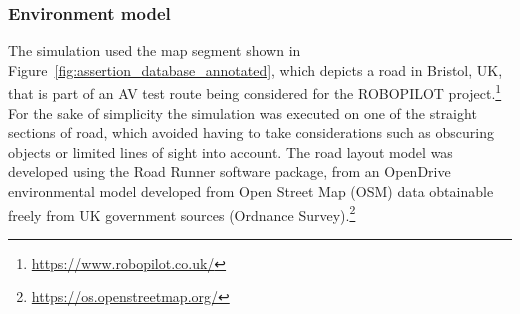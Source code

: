 \subsubsection{Environment model}
The simulation used the map segment shown in Figure~\ref{fig:assertion_database_annotated}, which depicts a road in Bristol, UK, that is part of an AV test route being considered for the ROBOPILOT project.\footnote{\url{https://www.robopilot.co.uk/}} 
%
For the sake of simplicity the simulation was executed on one of the straight sections of road, which avoided having to take considerations such as obscuring objects or limited lines of sight into account. The road layout model was developed using the Road Runner software package, from an OpenDrive environmental model developed from Open Street Map (OSM) data obtainable freely from UK government sources (Ordnance Survey).\footnote{\url{https://os.openstreetmap.org/}} 





